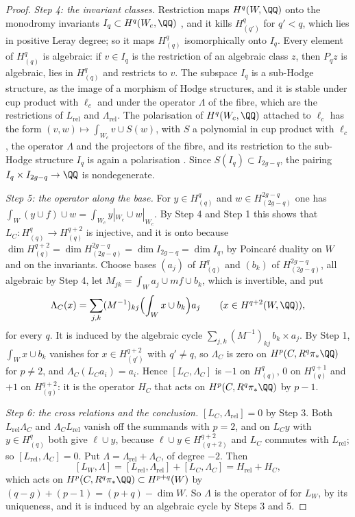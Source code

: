 \begin{proof}
\emph{Step 4: the invariant classes.} Restriction maps $H^{q}(W,\QQ)$ onto the
monodromy invariants $I_{q}\subset H^{q}(W_{c},\QQ)$ \cite[4.1.1(ii)]{Del71},
and it kills $H^{q}_{(q')}$ for $q'<q$, which lies in positive Leray degree;
so it maps $H^{q}_{(q)}$ isomorphically onto $I_{q}$. Every element of
$H^{q}_{(q)}$ is algebraic: if $v\in I_{q}$ is the restriction of an algebraic
class $z$, then $P_{q}z$ is algebraic, lies in $H^{q}_{(q)}$ and restricts to
$v$. The subspace $I_{q}$ is a sub-Hodge structure, as the image of a
morphism of Hodge structures, and it is stable under cup product with
$\ell_{c}$ and under the operator $\Lambda$ of the fibre, which are the
restrictions of $L_{\mathrm{rel}}$ and $\Lambda_{\mathrm{rel}}$. The
polarisation of $H^{q}(W_{c},\QQ)$ attached to $\ell_{c}$ has the form
$(v,w)\mapsto\int_{W_{c}}v\cup S(w)$, with $S$ a polynomial in cup product
with $\ell_{c}$, the operator $\Lambda$ and the projectors of the fibre, and
its restriction to the sub-Hodge structure $I_{q}$ is again a polarisation
\cite{Voi02}. Since $S(I_{q})\subset I_{2g-q}$, the pairing
$I_{q}\times I_{2g-q}\to\QQ$ is nondegenerate.

\emph{Step 5: the operator along the base.} For $y\in H^{q}_{(q)}$ and
$w\in H^{2g-q}_{(2g-q)}$ one has $\int_{W}(y\cup f)\cup w=\int_{W_{c}}
y|_{W_{c}}\cup w|_{W_{c}}$. By Step 4 and Step 1 this shows that
$L_{C}\colon H^{q}_{(q)}\to H^{q+2}_{(q)}$ is injective, and it is onto
because $\dim H^{q+2}_{(q)}=\dim H^{2g-q}_{(2g-q)}=\dim I_{2g-q}=\dim I_{q}$,
by Poincar\'e duality on $W$ and on the invariants. Choose bases $(a_{j})$ of
$H^{q}_{(q)}$ and $(b_{k})$ of $H^{2g-q}_{(2g-q)}$, all algebraic by Step 4,
let $M_{jk}=\int_{W}a_{j}\cup mf\cup b_{k}$, which is invertible, and put
\[
  \Lambda_{C}(x)=\sum_{j,k}(M^{-1})_{kj}\Bigl(\int_{W}x\cup b_{k}\Bigr)a_{j}
  \qquad(x\in H^{q+2}(W,\QQ)),
\]
for every $q$. It is induced by the algebraic cycle
$\sum_{j,k}(M^{-1})_{kj}\,b_{k}\times a_{j}$. By Step 1, $\int_{W}x\cup b_{k}$
vanishes for $x\in H^{q+2}_{(q')}$ with $q'\ne q$, so $\Lambda_{C}$ is zero
on $H^{p}(C,R^{q}\pi_{*}\QQ)$ for $p\ne2$, and $\Lambda_{C}(L_{C}a_{i})=a_{i}$.
Hence $[L_{C},\Lambda_{C}]$ is $-1$ on $H_{(q)}^{q}$, $0$ on
$H_{(q)}^{q+1}$ and $+1$ on $H_{(q)}^{q+2}$: it is the operator $H_{C}$ that
acts on $H^{p}(C,R^{q}\pi_{*}\QQ)$ by $p-1$.

\emph{Step 6: the cross relations and the conclusion.} $[L_{C},
\Lambda_{\mathrm{rel}}]=0$ by Step 3. Both $L_{\mathrm{rel}}\Lambda_{C}$ and
$\Lambda_{C}L_{\mathrm{rel}}$ vanish off the summands with $p=2$, and on
$L_{C}y$ with $y\in H^{q}_{(q)}$ both give $\ell\cup y$, because
$\ell\cup y\in H^{q+2}_{(q+2)}$ and $L_{C}$ commutes with $L_{\mathrm{rel}}$;
so $[L_{\mathrm{rel}},\Lambda_{C}]=0$. Put
$\Lambda=\Lambda_{\mathrm{rel}}+\Lambda_{C}$, of degree $-2$. Then
\[
  [L_{W},\Lambda]=[L_{\mathrm{rel}},\Lambda_{\mathrm{rel}}]+[L_{C},\Lambda_{C}]
  =H_{\mathrm{rel}}+H_{C},
\]
which acts on $H^{p}(C,R^{q}\pi_{*}\QQ)\subset H^{p+q}(W)$ by
$(q-g)+(p-1)=(p+q)-\dim W$. So $\Lambda$ is the operator of 
for $L_{W}$, by its uniqueness, and it is induced by an algebraic cycle by
Steps 3 and 5.
\end{proof}

